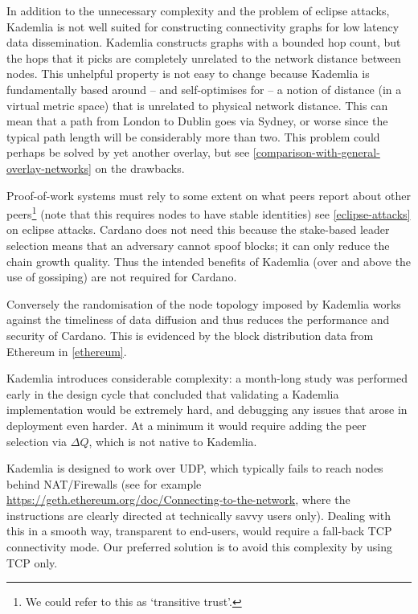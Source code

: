 \documentclass[11pt,a4paper]{article}
\begin{document}
In addition to the unnecessary complexity and the problem of eclipse
attacks, Kademlia is not well suited for constructing connectivity
graphs for low latency data dissemination. Kademlia constructs graphs
with a bounded hop count, but the hops that it picks are completely
unrelated to the network distance between nodes. This unhelpful property
is not easy to change because Kademlia is fundamentally based around --
and self-optimises for -- a notion of distance (in a virtual metric
space) that is unrelated to physical network distance. This can mean
that a path from London to Dublin goes via Sydney, or worse since the
typical path length will be considerably more than two. This problem
could perhaps be solved by yet another overlay, but see
\cref{comparison-with-general-overlay-networks} on the drawbacks.

Proof-of-work systems must rely to some extent on what peers report
about other peers\footnote{We could refer to this as `transitive trust'.}
(note that this requires nodes to have stable identities) see
\cref{eclipse-attacks} on eclipse attacks.
Cardano does not need this because the stake-based leader selection
means that an adversary cannot spoof blocks; it can only reduce the
chain growth quality. Thus the intended benefits of Kademlia (over and
above the use of gossiping) are not required for Cardano.

Conversely the randomisation of the node topology imposed by Kademlia
works against the timeliness of data diffusion and thus reduces the
performance and security of Cardano. This is evidenced by the block
distribution data from Ethereum in \cref{ethereum}.

Kademlia introduces considerable complexity: a month-long study was
performed early in the design cycle that concluded that validating a
Kademlia implementation would be extremely hard, and debugging any
issues that arose in deployment even harder. At a minimum it would
require adding the peer selection via $\Delta{}Q$, which is not native to
Kademlia.

Kademlia is designed to work over UDP, which typically fails to reach
nodes behind NAT/Firewalls (see for example
\href{https://geth.ethereum.org/doc/Connecting-to-the-network}{{https://geth.ethereum.org/doc/Connecting-to-the-network}},
where the instructions are clearly directed at technically savvy users
only). Dealing with this in a smooth way, transparent to end-users,
would require a fall-back TCP connectivity mode. Our preferred solution
is to avoid this complexity by using TCP only.
\end{document}

